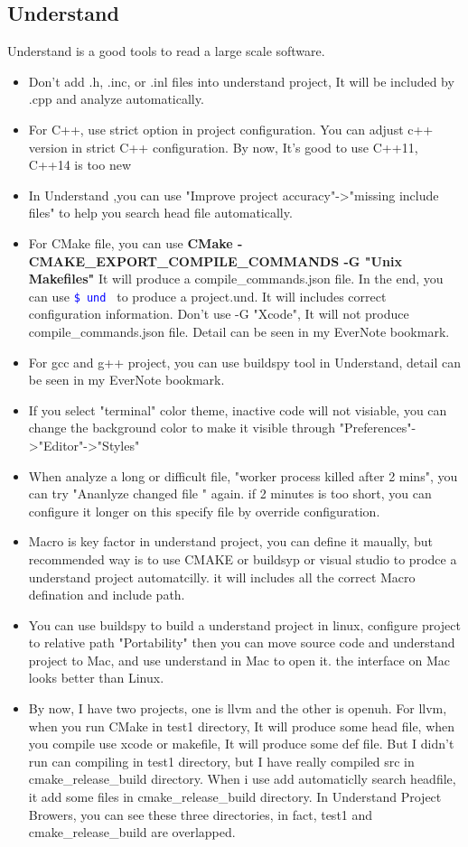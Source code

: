 \documentclass[paper=8.5in:11in, twoside, 12pt, pagesize=pdftex]{book}
\newcommand{\linuxcommand}[1]{\texttt{\textcolor{blue}{\$ #1 \Pisymbol{psy}{191}}}}
\begin{document}
\subsection{Understand}
Understand is a good tools to read a large scale software. 
\begin{itemize}
\item Don't add .h, .inc, or .inl files into understand project, It will be included by .cpp and analyze automatically. 
\item For C++, use strict option in project configuration. You can adjust c++ version in strict C++ configuration. By now, It's good to use C++11, C++14 is too new
\item In Understand ,you can use "Improve project accuracy"->"missing include files" to help you search head file automatically. 
\item For CMake file, you can use \textbf{CMake -CMAKE\_EXPORT\_COMPILE\_COMMANDS -G "Unix Makefiles"} It will produce a compile\_commands.json file. In the end, you can use \linuxcommand{und} to produce a project.und. It will includes correct configuration information.  Don't use -G "Xcode", It will not produce  compile\_commands.json file.  Detail can be seen in my EverNote bookmark. 
\item For gcc and g++ project, you can use buildspy tool in Understand, detail can be seen in my EverNote bookmark.
\item If you select "terminal" color theme, inactive code will not visiable, you can change the background color to make it visible through "Preferences"->"Editor"->"Styles"
\item When analyze a long or difficult file, "worker process killed after 2 mins", you can try "Ananlyze changed file " again. if 2 minutes is too short, you can configure it longer on this specify file by override configuration. 
\item Macro is key factor in understand project, you can define it maually, but recommended way is to use CMAKE or buildsyp or visual studio to prodce a understand project automatcilly. it will includes all the correct Macro defination and include path. 
\item You can use buildspy to build a understand project in linux, configure project to relative path "Portability" then you can move source code and understand project to Mac, and use understand in Mac to open it. the interface on Mac looks better than Linux. 

\item By now, I have two projects, one is llvm and the other is openuh.  For llvm, when you run CMake in test1 directory, It will produce some head file, when you compile use xcode or makefile, It will produce some def file. But I didn't run can compiling in test1 directory, but I have really compiled src in cmake\_release\_build directory. When i use add automaticlly search headfile, it add some files in cmake\_release\_build directory. In Understand Project Browers, you can see these three directories, in fact, test1 and cmake\_release\_build are overlapped. 


\end{itemize}
\end{document}
